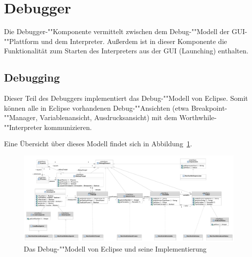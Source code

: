 \section{Debugger}

Die Debugger-""Komponente vermittelt zwischen dem Debug-""Modell der GUI-""Plattform und dem Interpreter. Außerdem ist in dieser Komponente die Funktionalität zum Starten des Interpreters aus der GUI (Launching) enthalten.

\subsection{Debugging}

Dieser Teil des Debuggers implementiert das Debug-""Modell von Eclipse. Somit können alle in Eclipse vorhandenen Debug-""Ansichten (etwa Breakpoint-""Manager, Variablenansicht, Ausdrucksansicht) mit dem Worthwhile-""Interpreter kommunizieren.

Eine Übersicht über dieses Modell findet sich in Abbildung~\ref{debugmodel}.

\begin{landscape}%
\begin{figure}
	\hspace{-5mm}%
	\includegraphics[height=0.75\textheight]{diagrams/debugmodel.pdf}
	\caption[B]{Das Debug-""Modell von Eclipse und seine Implementierung\footnotemark}
	\label{debugmodel}
\end{figure}
\end{landscape}

